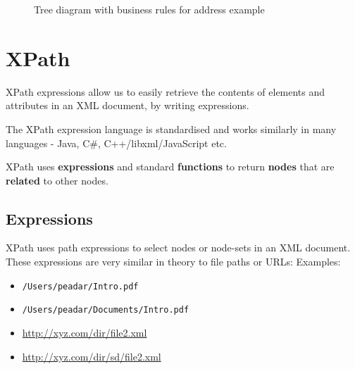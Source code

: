 \documentclass{pgnotes}
\begin{document}
\begin{figure}[htbp]
  \centering
  \caption{Tree diagram with business rules for address example}
  \label{fig:tree-diagram-with-rules}
\end{figure}
 
\section{XPath}

XPath expressions allow us to easily retrieve the contents of elements and attributes in an XML document, by writing expressions.  

The XPath expression language is standardised and works similarly in many languages - Java, C\#, C++/libxml/JavaScript etc.

XPath uses \textbf{expressions} and standard \textbf{functions} to return \textbf{nodes} that are \textbf{related} to other nodes. 


\subsection{Expressions}

XPath uses path expressions to select nodes or node-sets in an XML document.
These expressions are very similar in theory to file paths or URLs:
Examples:
\begin{itemize}
\item \texttt{/Users/peadar/Intro.pdf}
\item \texttt{/Users/peadar/Documents/Intro.pdf}
\item \url{http://xyz.com/dir/file2.xml}
\item \url{http://xyz.com/dir/sd/file2.xml}
\end{itemize}
\end{document}
